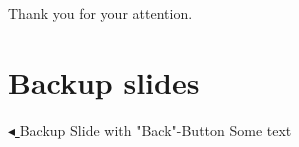 \documentclass[9pt]{beamer}
\begin{document}
\begin{frame}[standout]
	Thank you for your attention.
\end{frame}


%	
%	



\appendix
\section{Backup slides}

\begin{frame}[label=literature]{%
\hyperlink{empirics}{$\blacktriangleleft$ }
Backup Slide with "Back"-Button}
	Some text
\end{frame}
\end{document}
